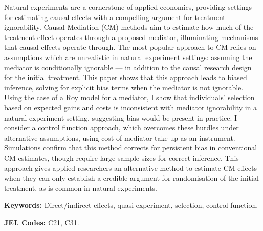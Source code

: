 \noindent
Natural experiments are a cornerstone of applied economics, providing settings for estimating causal effects with a compelling argument for treatment ignorability.
Causal Mediation (CM) methods aim to estimate how much of the treatment effect operates through a proposed mediator, illuminating mechanisms that causal effects operate through.
The most popular approach to CM relies on assumptions which are unrealistic in natural experiment settings: assuming the mediator is conditionally ignorable --- in addition to the causal research design for the initial treatment.
This paper shows that this approach leads to biased inference, solving for explicit bias terms when the mediator is not ignorable.
Using the case of a Roy model for a mediator, I show that individuals' selection based on expected gains and costs is inconsistent with mediator ignorability in a natural experiment setting, suggesting bias would be present in practice.
I consider a control function approach, which overcomes these hurdles under alternative assumptions, using cost of mediator take-up as an instrument.
Simulations confirm that this method corrects for persistent bias in conventional CM estimates, though require large sample sizes for correct inference.
This approach gives applied researchers an alternative method to estimate CM effects when they can only establish a credible argument for randomisation of the initial treatment, as is common in natural experiments.

\vspace{0.5cm}
\noindent
\textbf{Keywords:}
Direct/indirect effects, quasi-experiment, selection, control function.

\vspace{0.1cm}
\noindent
\textbf{JEL Codes:}
C21, C31.
